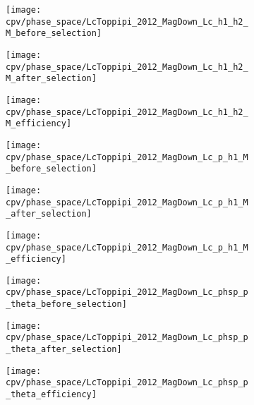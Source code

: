 \begin{figure}
  \centering

  \begin{subfigure}{0.25\textwidth}
    \texttt{[image: cpv/phase\_space/LcToppipi\_2012\_MagDown\_Lc\_h1\_h2\_M\_before\_selection]}
    \label{fig:cpv:phsp:effs:ppipi:Lc_h1_h2_M:before}
  \end{subfigure}
  \begin{subfigure}{0.25\textwidth}
    \texttt{[image: cpv/phase\_space/LcToppipi\_2012\_MagDown\_Lc\_h1\_h2\_M\_after\_selection]}
    \label{fig:cpv:phsp:effs:ppipi:Lc_h1_h2_M:after}
  \end{subfigure}
  \begin{subfigure}{0.25\textwidth}
    \texttt{[image: cpv/phase\_space/LcToppipi\_2012\_MagDown\_Lc\_h1\_h2\_M\_efficiency]}
    \label{fig:cpv:phsp:effs:ppipi:Lc_h1_h2_M:eff}
  \end{subfigure}

  \begin{subfigure}{0.25\textwidth}
    \texttt{[image: cpv/phase\_space/LcToppipi\_2012\_MagDown\_Lc\_p\_h1\_M\_before\_selection]}
    \label{fig:cpv:phsp:effs:ppipi:Lc_p_h1_M:before}
  \end{subfigure}
  \begin{subfigure}{0.25\textwidth}
    \texttt{[image: cpv/phase\_space/LcToppipi\_2012\_MagDown\_Lc\_p\_h1\_M\_after\_selection]}
    \label{fig:cpv:phsp:effs:ppipi:Lc_p_h1_M:after}
  \end{subfigure}
  \begin{subfigure}{0.25\textwidth}
    \texttt{[image: cpv/phase\_space/LcToppipi\_2012\_MagDown\_Lc\_p\_h1\_M\_efficiency]}
    \label{fig:cpv:phsp:effs:ppipi:Lc_p_h1_M:eff}
  \end{subfigure}

  \begin{subfigure}{0.25\textwidth}
    \texttt{[image: cpv/phase\_space/LcToppipi\_2012\_MagDown\_Lc\_phsp\_p\_theta\_before\_selection]}
    \label{fig:cpv:phsp:effs:ppipi:Lc_phsp_p_theta:before}
  \end{subfigure}
  \begin{subfigure}{0.25\textwidth}
    \texttt{[image: cpv/phase\_space/LcToppipi\_2012\_MagDown\_Lc\_phsp\_p\_theta\_after\_selection]}
    \label{fig:cpv:phsp:effs:ppipi:Lc_phsp_p_theta:after}
  \end{subfigure}
  \begin{subfigure}{0.25\textwidth}
    \texttt{[image: cpv/phase\_space/LcToppipi\_2012\_MagDown\_Lc\_phsp\_p\_theta\_efficiency]}
    \label{fig:cpv:phsp:effs:ppipi:Lc_phsp_p_theta:eff}
  \end{subfigure}


\end{figure}
